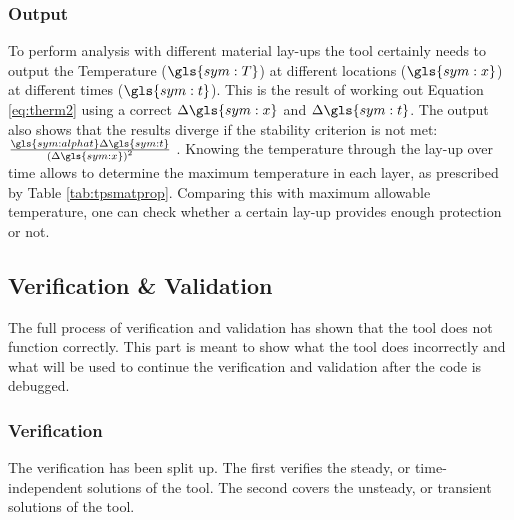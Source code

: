 \subsubsection{Output}
\label{subsec:thermoutput}
To perform analysis with different material lay-ups the tool certainly needs to output the Temperature ($\gls{sym:T}$) at different locations ($\gls{sym:x}$) at different times ($\gls{sym:t}$). This is the result of working out Equation \eqref{eq:therm2} using a correct $\Delta \gls{sym:x}$ and $\Delta \gls{sym:t}$. The output also shows that the results diverge if the stability criterion is not met: $\frac{\gls{sym:alphat}\Delta\gls{sym:t}}{\left(\Delta \gls{sym:x}\right)^2}$ \cite{Holman2002}. Knowing the temperature through the lay-up over time allows to determine the maximum temperature in each layer, as prescribed by Table \ref{tab:tpsmatprop}. Comparing this with maximum allowable temperature, one can check whether a certain lay-up provides enough protection or not.

\subsection{Verification \& Validation}
The full process of verification and validation has shown that the tool does not function correctly. This part is meant to show what the tool does incorrectly and what will be used to continue the verification and validation after the code is debugged.

\subsubsection{Verification}
The verification has been split up. The first verifies the steady, or time-independent solutions of the tool. The second covers the unsteady, or transient solutions of the tool.

